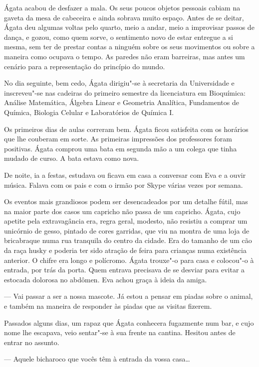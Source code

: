 Ágata acabou de desfazer a mala. Os seus poucos objetos pessoais
cabiam na gaveta da mesa de cabeceira e ainda sobrava muito espaço.
Antes de se deitar, Ágata deu algumas voltas pelo quarto, meio a andar,
meio a improvisar passos de dança, e gozou, como quem sorve, o
sentimento novo de estar entregue a si mesma, sem ter de prestar contas
a ninguém sobre os seus movimentos ou sobre a maneira como ocupava o
tempo. As paredes não eram barreiras, mas antes um cenário para a
representação do princípio do mundo.


No dia seguinte, bem cedo, Ágata dirigiu"-se à secretaria da Universidade
e inscreveu"-se nas cadeiras do primeiro semestre da licenciatura em
Bioquímica: Análise Matemática, Álgebra Linear e Geometria Analítica,
Fundamentos de Química, Biologia Celular e Laboratórios de Química I.

Os primeiros dias de aulas correram bem. Ágata ficou satisfeita com os
horários que lhe couberam em sorte. As primeiras impressões dos
professores foram positivas. Ágata comprou uma bata em segunda mão a um
colega que tinha mudado de curso. A bata estava como nova.

De noite, ia a festas, estudava ou ficava em casa a conversar com Eva
e a ouvir música. Falava com os pais e com o irmão por Skype várias
vezes por semana.

Os eventos mais grandiosos podem ser desencadeados por um detalhe fútil,
mas na maior parte dos casos um capricho não passa de um capricho.
Ágata, cujo apetite pela extravagância era, regra geral, modesto, não
resistiu a comprar um unicórnio de gesso, pintado de cores garridas, que
viu na montra de uma loja de bricabraque numa rua tranquila do centro
da cidade. Era do tamanho de um cão da raça husky e poderia ter sido
atração de feira para crianças numa existência anterior. O chifre era
longo e polícromo. Ágata trouxe"-o para casa e colocou"-o à entrada, por
trás da porta. Quem entrava precisava de se desviar para evitar a
estocada dolorosa no abdômen. Eva achou graça à ideia da amiga.

--- Vai passar a ser a nossa mascote. Já estou a pensar em piadas sobre o
  animal, e também na maneira de responder às piadas que as visitas
  fizerem.

Passados alguns dias, um rapaz que Ágata conhecera fugazmente num bar,
e cujo nome lhe escapava, veio sentar"-se à sua frente na cantina.
Hesitou antes de entrar no assunto.

--- Aquele bicharoco que vocês têm à entrada da vossa casa\ldots{}


